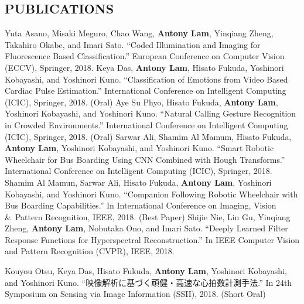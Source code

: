 \documentclass[letterpaper,10pt]{article}
\begin{document}
\subsection*{PUBLICATIONS}
Yuta Asano, Misaki Meguro, Chao Wang, \textbf{Antony Lam}, Yinqiang Zheng, Takahiro Okabe, and Imari Sato. ``Coded Illumination and Imaging for Fluorescence Based Classification.'' European Conference on Computer Vision (ECCV), Springer, 2018.\vspace{0.05in}\newline
Keya Das, \textbf{Antony Lam}, Hisato Fukuda, Yoshinori Kobayashi, and Yoshinori Kuno. ``Classification of Emotions from Video Based Cardiac Pulse Estimation.'' International Conference on Intelligent Computing (ICIC), Springer, 2018. (Oral)\vspace{0.05in}\newline
Aye Su Phyo, Hisato Fukuda, \textbf{Antony Lam}, Yoshinori Kobayashi, and Yoshinori Kuno. ``Natural Calling Gesture Recognition in Crowded Environments.'' International Conference on Intelligent Computing (ICIC), Springer, 2018. (Oral)\vspace{0.05in}\newline
Sarwar Ali, Shamim Al Mamum, Hisato Fukuda, \textbf{Antony Lam}, Yoshinori Kobayashi, and Yoshinori Kuno. ``Smart Robotic Wheelchair for Bus Boarding Using CNN Combined with Hough Transforms.'' International Conference on Intelligent Computing (ICIC), Springer, 2018. \vspace{0.05in}\newline
Shamim Al Mamun, Sarwar Ali, Hisato Fukuda, \textbf{Antony Lam}, Yoshinori Kobayashi, and Yoshinori Kuno. ``Companion Following Robotic Wheelchair with Bus Boarding Capabilities.'' In International Conference on Imaging, Vision \&\ Pattern Recognition, IEEE, 2018. (Best Paper) \vspace{0.05in}\newline
Shijie Nie, Lin Gu, Yinqiang Zheng, \textbf{Antony Lam}, Nobutaka Ono, and Imari Sato. ``Deeply Learned Filter Response Functions for Hyperspectral Reconstruction.'' In IEEE Computer Vision and Pattern Recognition (CVPR), IEEE, 2018.\vspace{0.05in}\newline
\begin{CJK}{UTF8}{min}Kouyou Otsu, Keya Das, Hisato Fukuda, \textbf{Antony Lam}, Yoshinori Kobayashi, and Yoshinori Kuno. ``映像解析に基づく頑健・高速な心拍数計測手法.'' In 24th Symposium on Sensing via Image Information (SSII), 2018. (Short Oral)\end{CJK}\vspace{0.05in}\newline
\end{document}
